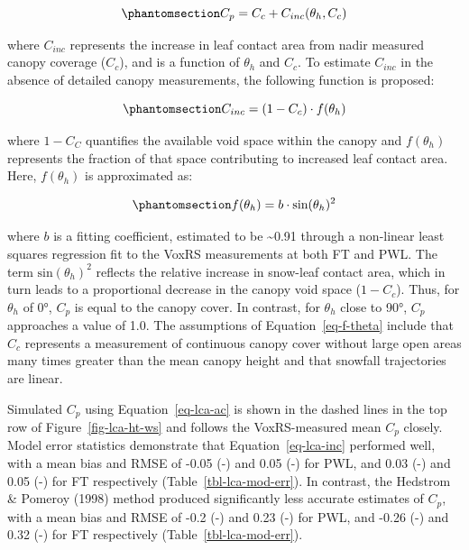\documentclass[
  letterpaper,
]{tex/uofsthesis-cs}
\begin{document}
\begin{equation}\phantomsection\label{eq-lca-ac}{
C_p = C_c + C_{inc}(\theta_h, C_c)
}\end{equation}

where \(C_{inc}\) represents the increase in leaf contact area from
nadir measured canopy coverage (\(C_c\)), and is a function of
\(\theta_h\) and \(C_c\). To estimate \(C_{inc}\) in the absence of
detailed canopy measurements, the following function is proposed:

\begin{equation}\phantomsection\label{eq-lca-inc}{
C_{inc} = (1-C_c)\cdot f(\theta_h)
}\end{equation}

where \(1-C_C\) quantifies the available void space within the canopy
and \(f(\theta_h)\) represents the fraction of that space contributing
to increased leaf contact area. Here, \(f(\theta_h)\) is approximated
as:

\begin{equation}\phantomsection\label{eq-f-theta}{
f(\theta_h) = b \cdot\text{sin}(\theta_h)^2
}\end{equation}

where \(b\) is a fitting coefficient, estimated to be
\textasciitilde0.91 through a non-linear least squares regression fit to
the VoxRS measurements at both FT and PWL. The term
\(\text{sin}(\theta_h)^2\) reflects the relative increase in snow-leaf
contact area, which in turn leads to a proportional decrease in the
canopy void space (\(1-C_c\)). Thus, for \(\theta_h\) of 0°, \(C_p\) is
equal to the canopy cover. In contrast, for \(\theta_h\) close to 90°,
\(C_p\) approaches a value of 1.0. The assumptions of
Equation~\ref{eq-f-theta} include that \(C_c\) represents a measurement
of continuous canopy cover without large open areas many times greater
than the mean canopy height and that snowfall trajectories are linear.

Simulated \(C_p\) using Equation~\ref{eq-lca-ac} is shown in the dashed
lines in the top row of Figure~\ref{fig-lca-ht-ws} and follows the
VoxRS-measured mean \(C_p\) closely. Model error statistics demonstrate
that Equation~\ref{eq-lca-inc} performed well, with a mean bias and RMSE
of -0.05 (-) and 0.05 (-) for PWL, and 0.03 (-) and 0.05 (-) for FT
respectively (Table~\ref{tbl-lca-mod-err}). In contrast, the Hedstrom \&
Pomeroy (1998) method produced significantly less accurate estimates of
\(C_p\), with a mean bias and RMSE of -0.2 (-) and 0.23 (-) for PWL, and
-0.26 (-) and 0.32 (-) for FT respectively
(Table~\ref{tbl-lca-mod-err}).
\end{document}

